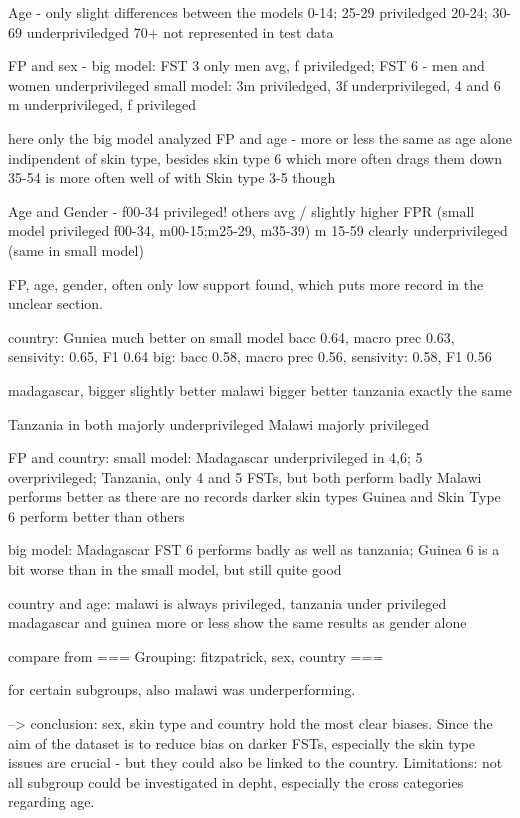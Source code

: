 \documentclass[12pt, a4paper, oneside]{book}   	%
\begin{document}
			Age - only slight differences between the models
			0-14; 25-29 priviledged
			20-24; 30-69 underpriviledged
			70+ not represented in test data	
			
			FP and sex - big model: FST 3 only men avg, f priviledged; FST 6 - men and women underprivileged
			small model: 3m priviledged, 3f underprivileged, 4 and 6 m underprivileged, f privileged
			
			
			
			here only the big model analyzed
			FP and age - more or less the same as age alone indipendent of skin type, besides skin type 6 which more often drags them down
			35-54 is more often well of with Skin type 3-5 though
			
			
			Age and Gender - f00-34 privileged! others avg / slightly higher FPR (small model privileged f00-34, m00-15;m25-29, m35-39)
			m 15-59 clearly underprivileged (same in small model)
			
			
			FP, age, gender, often only low support found, which puts more record in the unclear section.  
			
			
			country: Guniea much better on small model
			bacc 0.64, macro prec 0.63, sensivity: 0.65, F1 0.64
			big:
			bacc 0.58, macro prec 0.56, sensivity: 0.58, F1 0.56
						
			madagascar, bigger slightly better
			malawi bigger better
			tanzania exactly the same
			
			Tanzania in both majorly underprivileged
			Malawi majorly privileged
			
			FP and country: small model: Madagascar underprivileged in 4,6; 5 overprivileged;  
			Tanzania, only 4 and 5 FSTs, but both perform badly
			Malawi performs better as there are no records darker skin types
			Guinea and Skin Type 6 perform better than others
			
			big model: Madagascar FST 6 performs badly as well as tanzania; Guinea 6 is a bit worse than in the small model, but still quite good
						
			
			country and age: malawi is always privileged, tanzania under privileged
			madagascar and guinea more or less show the same results as gender alone
			
			
			compare from === Grouping: fitzpatrick, sex, country ===
			
			
			for certain subgroups, also malawi was underperforming.
			
			--> conclusion: sex, skin type and country hold the most clear biases. Since the aim of the dataset is to reduce bias on darker FSTs, especially the skin type issues are crucial - but they could also be linked to the country.
			Limitations: not all subgroup could be investigated in depht, especially the cross categories regarding age.
			
\end{document}
